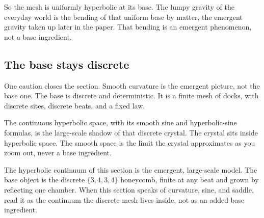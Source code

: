 So the mesh is uniformly hyperbolic at its base. The lumpy gravity of the everyday world is the bending of that uniform base by matter, the emergent gravity taken up later in the paper. That bending is an emergent phenomenon, not a base ingredient.

\subsection{The base stays discrete}

One caution closes the section. Smooth curvature is the emergent picture, not the base one. The base is discrete and deterministic. It is a finite mesh of docks, with discrete sites, discrete beats, and a fixed law.

The continuous hyperbolic space, with its smooth sine and hyperbolic-sine formulas, is the large-scale shadow of that discrete crystal. The crystal sits inside hyperbolic space. The smooth space is the limit the crystal approximates as you zoom out, never a base ingredient.

\begin{result}
The hyperbolic continuum of this section is the emergent, large-scale model. The base object is the discrete
$\{3,4,3,4\}$ honeycomb, finite at any beat and grown by reflecting one chamber. When this section speaks of
curvature, sine, and saddle, read it as the continuum the discrete mesh lives inside, not as an added base
ingredient.
\end{result}
